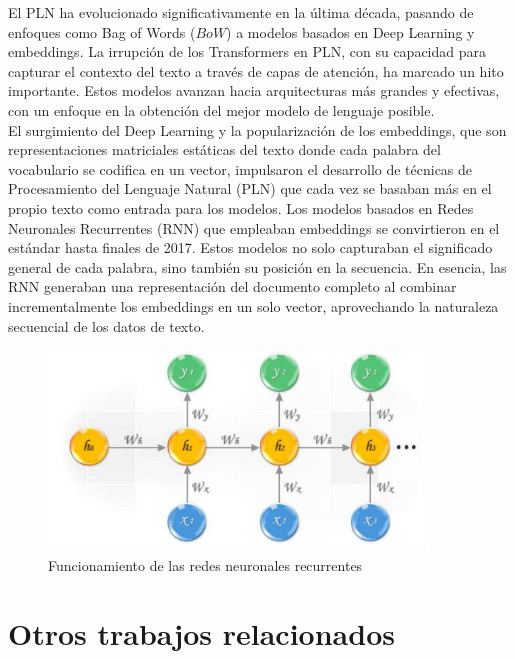 El PLN ha evolucionado significativamente en la última década, pasando de enfoques como Bag of Words ($BoW$) a modelos basados en Deep Learning y embeddings. La irrupción de los Transformers en PLN, con su capacidad para capturar el contexto del texto a través de capas de atención, ha marcado un hito importante. Estos modelos avanzan hacia arquitecturas más grandes y efectivas, con un enfoque en la obtención del mejor modelo de lenguaje posible.\\

El surgimiento del Deep Learning y la popularización de los embeddings, que son representaciones matriciales estáticas del texto donde cada palabra del vocabulario se codifica en un vector, impulsaron el desarrollo de técnicas de Procesamiento del Lenguaje Natural (PLN) que cada vez se basaban más en el propio texto como entrada para los modelos. Los modelos basados en Redes Neuronales Recurrentes (RNN) que empleaban embeddings se convirtieron en el estándar hasta finales de 2017. Estos modelos no solo capturaban el significado general de cada palabra, sino también su posición en la secuencia. En esencia, las RNN generaban una representación del documento completo al combinar incrementalmente los embeddings en un solo vector, aprovechando la naturaleza secuencial de los datos de texto.\\

\begin{figure}[h]
	\centering
	\includegraphics[width=0.9\textwidth]{Imagenes/Redes-Neuronales-Recurrentes}
	\caption{Funcionamiento de las redes neuronales recurrentes}
	\label{fig:1}
\end{figure}



\section{Otros trabajos relacionados}
